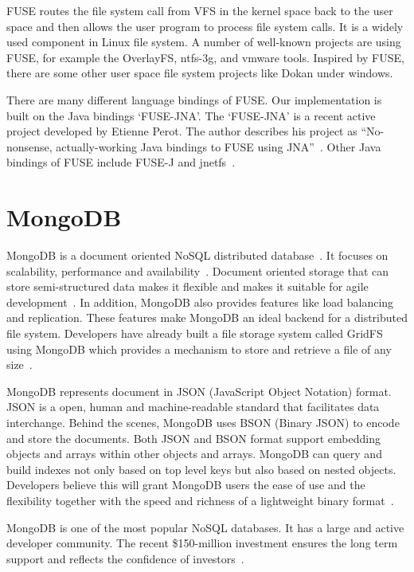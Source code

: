     FUSE routes the file system call from VFS in the kernel space back to the user space and then allows the user program to process file system calls. It is a widely used component in Linux file system. A number of well-known projects are using FUSE, for example the OverlayFS, ntfs-3g, and vmware tools. Inspired by FUSE, there are some other user space file system projects like Dokan under windows.

    There are many different language bindings of FUSE. Our implementation is built on the Java bindings `FUSE-JNA'. The `FUSE-JNA' is a recent active project developed by Etienne Perot. The author describes his project as ``No-nonsense, actually-working Java bindings to FUSE using JNA''~\cite{fusejna}. Other Java bindings of FUSE include FUSE-J and jnetfs~\cite{jnetfs}.

\section{MongoDB}

    MongoDB is a document oriented NoSQL distributed database~\cite{mongo_overview}. It focuses on scalability, performance and availability~\cite{mongo_overview}. Document oriented storage that can store semi-structured data makes it flexible and makes it suitable for agile development~\cite{docdb}. In addition, MongoDB also provides features like load balancing and replication. These features make MongoDB an ideal backend for a distributed file system. Developers have already built a file storage system called GridFS using MongoDB which provides a mechanism to store and retrieve a file of any size~\cite{gridfs}.

    MongoDB represents document in JSON (JavaScript Object Notation) format. JSON is a open, human and machine-readable standard that facilitates data interchange. Behind the scenes, MongoDB uses BSON (Binary JSON) to encode and store the documents. Both JSON and BSON format support embedding objects and arrays within other objects and arrays. MongoDB can query and build indexes not only based on top level keys but also based on nested objects. Developers believe this will grant MongoDB users the ease of use and the flexibility together with the speed and richness of a lightweight binary format~\cite{bson}.

    MongoDB is one of the most popular NoSQL databases. It has a large and active developer community. The recent \$150-million investment ensures the long term support and reflects the confidence of investors~\cite{mongoInvest}.

